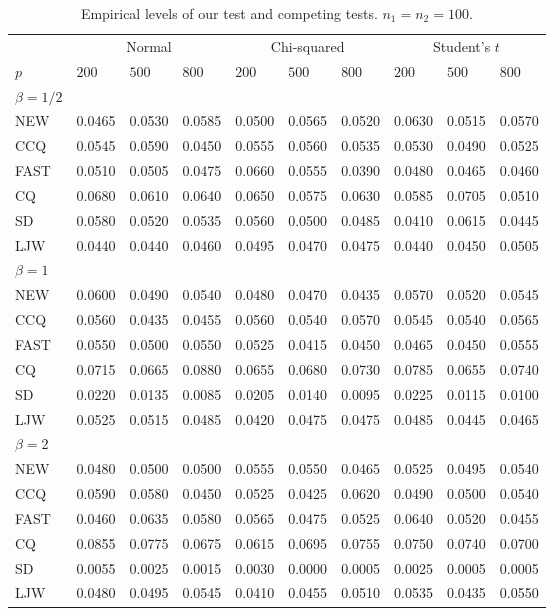 \documentclass[3p]{elsarticle}
\theoremstyle{plain}
\theoremstyle{definition}
\theoremstyle{remark}
\begin{document}
\begin{table}[ht]
\caption{Empirical levels of our test and competing tests. $n_1=n_2=100$.} 
\label{hahaha2}
\vspace{3mm}
\centering
\begin{tabular}{llllllllll}
\toprule
    &   \multicolumn{3}{c}{Normal} & \multicolumn{3}{c}{Chi-squared}& \multicolumn{3}{c}{Student's $t$}  \\
    \cmidrule(r){2-4}
\cmidrule(r){5-7}
\cmidrule(r){8-10}
    $p$ & $200$ &  $500$ & $800$ & $200$  & $500$ & $800$ & $200$ & $500$ & $800$ \\ 
\midrule
    $\beta=1/2$\\
NEW & 0.0465 & 0.0530 & 0.0585 & 0.0500 & 0.0565 & 0.0520 & 0.0630 & 0.0515 & 0.0570 \\ 
CCQ & 0.0545 & 0.0590 & 0.0450 & 0.0555 & 0.0560 & 0.0535 & 0.0530 & 0.0490 & 0.0525 \\ 
FAST & 0.0510 & 0.0505 & 0.0475 & 0.0660 & 0.0555 & 0.0390 & 0.0480 & 0.0465 & 0.0460 \\ 
CQ & 0.0680 & 0.0610 & 0.0640 & 0.0650 & 0.0575 & 0.0630 & 0.0585 & 0.0705 & 0.0510 \\ 
SD & 0.0580 & 0.0520 & 0.0535 & 0.0560 & 0.0500 & 0.0485 & 0.0410 & 0.0615 & 0.0445 \\ 
LJW & 0.0440 & 0.0440 & 0.0460 & 0.0495 & 0.0470 & 0.0475 & 0.0440 & 0.0450 & 0.0505 \\ 
    $\beta=1$\\
NEW & 0.0600 & 0.0490 & 0.0540 & 0.0480 & 0.0470 & 0.0435 & 0.0570 & 0.0520 & 0.0545 \\ 
CCQ & 0.0560 & 0.0435 & 0.0455 & 0.0560 & 0.0540 & 0.0570 & 0.0545 & 0.0540 & 0.0565 \\ 
FAST & 0.0550 & 0.0500 & 0.0550 & 0.0525 & 0.0415 & 0.0450 & 0.0465 & 0.0450 & 0.0555 \\ 
CQ & 0.0715 & 0.0665 & 0.0880 & 0.0655 & 0.0680 & 0.0730 & 0.0785 & 0.0655 & 0.0740 \\ 
SD & 0.0220 & 0.0135 & 0.0085 & 0.0205 & 0.0140 & 0.0095 & 0.0225 & 0.0115 & 0.0100 \\ 
LJW & 0.0525 & 0.0515 & 0.0485 & 0.0420 & 0.0475 & 0.0475 & 0.0485 & 0.0445 & 0.0465 \\ 
    $\beta=2$\\
NEW & 0.0480 & 0.0500 & 0.0500 & 0.0555 & 0.0550 & 0.0465 & 0.0525 & 0.0495 & 0.0540 \\ 
CCQ & 0.0590 & 0.0580 & 0.0450 & 0.0525 & 0.0425 & 0.0620 & 0.0490 & 0.0500 & 0.0540 \\ 
FAST & 0.0460 & 0.0635 & 0.0580 & 0.0565 & 0.0475 & 0.0525 & 0.0640 & 0.0520 & 0.0455 \\ 
CQ & 0.0855 & 0.0775 & 0.0675 & 0.0615 & 0.0695 & 0.0755 & 0.0750 & 0.0740 & 0.0700 \\ 
SD & 0.0055 & 0.0025 & 0.0015 & 0.0030 & 0.0000 & 0.0005 & 0.0025 & 0.0005 & 0.0005 \\ 
LJW & 0.0480 & 0.0495 & 0.0545 & 0.0410 & 0.0455 & 0.0510 & 0.0535 & 0.0435 & 0.0550 \\ 
\bottomrule
\end{tabular}
\end{table}
\end{document}
